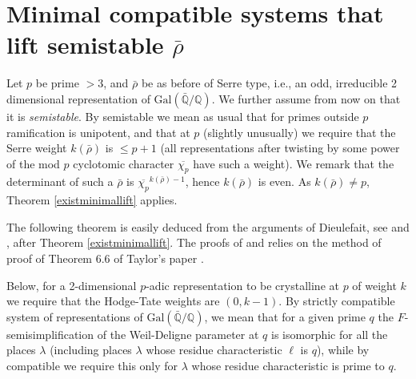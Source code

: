 \documentclass[12pt]{article}
\newcommand{\Q}{\mathbb{Q}}
\newcommand{\rhobar}{\overline{\rho}}
\def\rhobar{ {\bar {\rho} } }
\def\rhob{ {\bar {\rho} } }
\newcommand{\Galois}{\mathrm{Gal}}
\newcommand{\Gal}{\Galois( \bar{ {\mathbb Q}}/{\mathbb Q})}
\begin{document}
\section{Minimal compatible systems that lift semistable $\rhobar$}

Let $p$ be  prime $>3$, and $\rhob$ be as before of Serre type,
i.e., an
odd, irreducible 2 dimensional representation of $\Gal$. We further assume
from
now on that it is {\it semistable}.
By semistable we mean as usual that for primes outside
$p$ ramification is unipotent, and that at $p$ (slightly unusually)
we require that
the Serre weight $k(\rhob)$ is $\leq p+1$ (all
representations after
twisting by
some power of the mod $p$ cyclotomic character ${\overline{\chi_p}}$ have
such a
weight). We remark that the determinant of such a $\rhob$
is $\overline{\chi_{p}}^{k(\rhob )-1}$, hence $k(\rhob )$ is even.
As $k(\rhob )\not= p$, Theorem \ref{existminimallift} applies.


The following theorem is easily deduced from the arguments of
Dieulefait, see \cite{D}
and \cite{Wint}, after Theorem \ref{existminimallift}.
The proofs of \cite{D} and \cite{Wint}
relies on the method of proof of Theorem 6.6 of
Taylor's paper \cite{[T03]}.

Below, for a
2-dimensional  $p$-adic representation to be crystalline at $p$ of weight
$k$
 we require that the Hodge-Tate weights are
$(0,k-1)$. By strictly
compatible system of representations of $\Gal$,
we mean that for a given prime $q$ the
$F$-semisimplification of the Weil-Deligne
parameter at $q$ is isomorphic for all the places $\lambda$
(including places $\lambda$ whose residue characteristic $\ell$ is $q$), while by compatible we require this
only for
$\lambda$ whose residue characteristic is prime to $q$.
\end{document}
